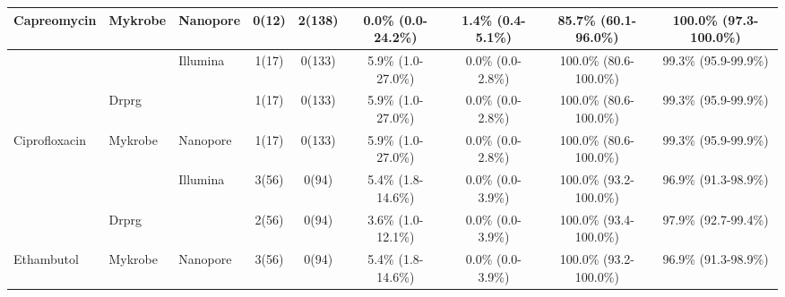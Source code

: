 \begin{table}
{\begin{tabular}{|l|l|l|c|c|c|c|c|c|}
\multirow{-3}{*}{Capreomycin}   & Mykrobe                 & \multirow{-2}{*}{Nanopore} & 0(12)                          & 2(138)                          & 0.0\% (0.0-24.2\%)                          & 1.4\% (0.4-5.1\%)                           & 85.7\% (60.1-96.0\%)                           & 100.0\% (97.3-100.0\%)                         \\ \hline
                                &                         & Illumina                   & \cellcolor[HTML]{EFEFEF}1(17)  & \cellcolor[HTML]{EFEFEF}0(133)  & \cellcolor[HTML]{EFEFEF}5.9\% (1.0-27.0\%)  & \cellcolor[HTML]{EFEFEF}0.0\% (0.0-2.8\%)   & \cellcolor[HTML]{EFEFEF}100.0\% (80.6-100.0\%) & \cellcolor[HTML]{EFEFEF}99.3\% (95.9-99.9\%)   \\ \cline{3-9} 
                                & \multirow{-2}{*}{Drprg} &                            & 1(17)                          & 0(133)                          & 5.9\% (1.0-27.0\%)                          & 0.0\% (0.0-2.8\%)                           & 100.0\% (80.6-100.0\%)                         & 99.3\% (95.9-99.9\%)                           \\ \cline{2-2} \cline{4-9} 
\multirow{-3}{*}{Ciprofloxacin} & Mykrobe                 & \multirow{-2}{*}{Nanopore} & \cellcolor[HTML]{EFEFEF}1(17)  & \cellcolor[HTML]{EFEFEF}0(133)  & \cellcolor[HTML]{EFEFEF}5.9\% (1.0-27.0\%)  & \cellcolor[HTML]{EFEFEF}0.0\% (0.0-2.8\%)   & \cellcolor[HTML]{EFEFEF}100.0\% (80.6-100.0\%) & \cellcolor[HTML]{EFEFEF}99.3\% (95.9-99.9\%)   \\ \hline
                                &                         & Illumina                   & 3(56)                          & 0(94)                           & 5.4\% (1.8-14.6\%)                          & 0.0\% (0.0-3.9\%)                           & 100.0\% (93.2-100.0\%)                         & 96.9\% (91.3-98.9\%)                           \\ \cline{3-9} 
                                & \multirow{-2}{*}{Drprg} &                            & \cellcolor[HTML]{EFEFEF}2(56)  & \cellcolor[HTML]{EFEFEF}0(94)   & \cellcolor[HTML]{EFEFEF}3.6\% (1.0-12.1\%)  & \cellcolor[HTML]{EFEFEF}0.0\% (0.0-3.9\%)   & \cellcolor[HTML]{EFEFEF}100.0\% (93.4-100.0\%) & \cellcolor[HTML]{EFEFEF}97.9\% (92.7-99.4\%)   \\ \cline{2-2} \cline{4-9} 
\multirow{-3}{*}{Ethambutol}    & Mykrobe                 & \multirow{-2}{*}{Nanopore} & 3(56)                          & 0(94)                           & 5.4\% (1.8-14.6\%)                          & 0.0\% (0.0-3.9\%)                           & 100.0\% (93.2-100.0\%)                         & 96.9\% (91.3-98.9\%)                           \\ \hline

\end{tabular}}
\end{table}
